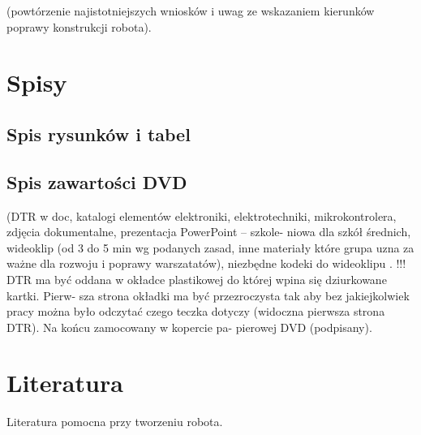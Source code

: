 \documentclass[11pt,a4paper]{article}
\begin{document}
 (powtórzenie najistotniejszych wniosków i uwag ze wskazaniem kierunków poprawy konstrukcji robota).

\section{Spisy}
\subsection{Spis rysunków i tabel} 
\subsection{Spis zawartości DVD} (DTR w doc, katalogi elementów elektroniki,
elektrotechniki, mikrokontrolera, zdjęcia dokumentalne, prezentacja PowerPoint – szkole-
niowa dla szkół średnich, wideoklip (od 3 do 5 min wg podanych zasad, inne materiały które
grupa uzna za ważne dla rozwoju i poprawy warszatatów), niezbędne kodeki do wideoklipu .
!!! DTR ma być oddana w okładce plastikowej do której wpina się dziurkowane kartki. Pierw-
sza strona okładki ma być przezroczysta tak aby bez jakiejkolwiek pracy można było odczytać
czego teczka dotyczy (widoczna pierwsza strona DTR). Na końcu zamocowany w kopercie pa-
pierowej DVD (podpisany). 

\section{Literatura}
Literatura pomocna przy tworzeniu robota.
\end{document}
